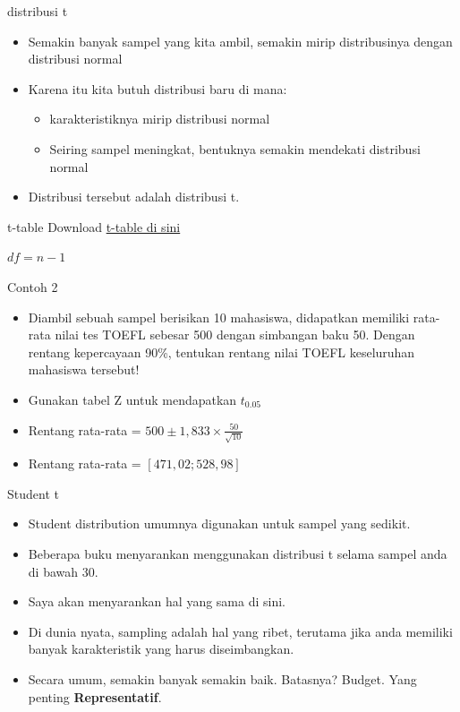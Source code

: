 \documentclass[
  ignorenonframetext,
]{beamer}
\begin{document}
\begin{frame}{distribusi t}
\label{distribusi-t}
\begin{itemize}
\item
  Semakin banyak sampel yang kita ambil, semakin mirip distribusinya
  dengan distribusi normal
\item
  Karena itu kita butuh distribusi baru di mana:

  \begin{itemize}
  \item
    karakteristiknya mirip distribusi normal
  \item
    Seiring sampel meningkat, bentuknya semakin mendekati distribusi
    normal
  \end{itemize}
\item
  Distribusi tersebut adalah distribusi t.
\end{itemize}
\end{frame}

\begin{frame}{t-table}
\label{t-table}
Download
\href{https://1drv.ms/b/s!AjelszXKKcmsifhDr8cYIgeuMVSIDw?e=ioiSHv}{t-table
di sini}

\(df=n-1\)
\end{frame}

\begin{frame}{Contoh 2}
\label{contoh-2-2}
\begin{itemize}
\item
  Diambil sebuah sampel berisikan 10 mahasiswa, didapatkan memiliki
  rata-rata nilai tes TOEFL sebesar 500 dengan simbangan baku 50. Dengan
  rentang kepercayaan 90\%, tentukan rentang nilai TOEFL keseluruhan
  mahasiswa tersebut!
\item
  Gunakan tabel Z untuk mendapatkan \(t_{0.05}\)
\item
  Rentang rata-rata = \(500 \pm 1,833\times\frac{50}{\sqrt{10}}\)
\item
  Rentang rata-rata = \(\left[471,02;528,98\right]\)
\end{itemize}
\end{frame}

\begin{frame}{Student t}
\label{student-t}
\begin{itemize}
\item
  Student distribution umumnya digunakan untuk sampel yang sedikit.
\item
  Beberapa buku menyarankan menggunakan distribusi t selama sampel anda
  di bawah 30.
\item
  Saya akan menyarankan hal yang sama di sini.
\item
  Di dunia nyata, sampling adalah hal yang ribet, terutama jika anda
  memiliki banyak karakteristik yang harus diseimbangkan.
\item
  Secara umum, semakin banyak semakin baik. Batasnya? Budget. Yang
  penting \textbf{Representatif}.
\end{itemize}
\end{frame}
\end{document}
